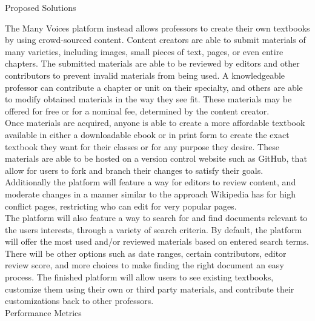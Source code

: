 \documentclass[letterpaper, 10pt, draftclsnofoot, onecolumn]{IEEEtran}
\begin{document}
\vspace{1pc}
\normalsize Proposed Solutions
\vspace{1pc}

 The Many Voices platform instead allows professors to create their own textbooks 
by using crowd-sourced content. Content creators are able to submit materials of 
many varieties, including images, small pieces of text, pages, or even entire chapters. 
The submitted materials are able to be reviewed by editors and other contributors to prevent invalid 
materials from being used.
A knowledgeable professor can contribute a chapter or unit on their specialty, and 
others are able to modify obtained materials in the way they see fit. These materials may be
offered for free or for a nominal fee, determined by the content creator.  \\

Once materials are acquired, anyone is able to create a more affordable textbook available in either
a downloadable ebook or in print form to create the exact textbook they want for their classes
or for any purpose they desire. These materials are able to be hosted on a version control 
website such as GitHub, that allow for users to fork and branch their changes to satisfy their goals.
Additionally the platform will feature a way for editors to review content, and moderate changes in a manner similar
to the approach Wikipedia has for high conflict pages, restricting who can edit for very popular pages. \\

The platform will also feature a way to search for and find documents relevant to the users interests, 
through a variety of search criteria. By default, the platform will offer the most used and/or reviewed materials
based on entered search terms. There will be other options such as date ranges, certain contributors, 
editor review score, and more choices to make finding the right document an easy process.
The finished platform will allow users to see existing 
textbooks, customize them using their own or third party materials, and contribute their 
customizations back to other professors. \\

\vspace{1pc}
\normalsize Performance Metrics
\vspace{1pc}
\end{document}
